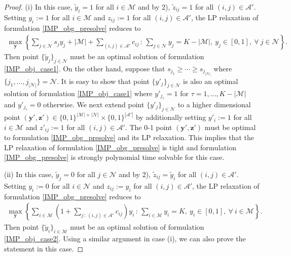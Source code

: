 \documentclass[a4paper,10pt]{article}
\theoremstyle{plain}
\newcommand{\revv}[1]{{#1}}
\begin{document}
\begin{proof}
		(i) In this case, $\tilde{y}_i=1$ for all $i\in\mathcal{M}$ and by 2), $ \tilde{z}_{ij}=1 $ for all $(i,j)\in \mathcal{A}'$. Setting $y_i := 1$  for all $i\in\mathcal{M}$ and $ {z}_{ij}:=1 $ for all $(i,j)\in \mathcal{A}'$, the LP relaxation of formulation \eqref{IMP_obg_presolve} reduces to
		\begin{equation}\label{IMP_obj_case1}
			\begin{aligned}
				\max_{\boldsymbol{y}} \left \{\sum_{j\in\mathcal{N}}s_jy_j+|\mathcal{M}|+\sum_{(i,j)\in\mathcal{A}'}c_{ij}\,:\, \sum_{j\in \mathcal{N}}y_j = K-|\mathcal{M}|, ~ y_j \in[0,1] ,~ \forall ~j\in \mathcal{N}\right\}.
			\end{aligned}
		\end{equation}
		Then point $\{ \tilde{y}_j \}_{j\in \mathcal{N}}$ must \revv{be an optimal solution of} formulation \eqref{IMP_obj_case1}.
		On the other hand, suppose that $s_{j_1} \geq \cdots \geq s_{j_{|\mathcal{N}|}} $ where $\{ j_1, \ldots, j_{|\mathcal{N}|} \} = \mathcal{N}$.
		It is easy to show that point $\{ y'_j \}_{j \in \mathcal{N}}$ is also \revv{an optimal solution of} formulation \eqref{IMP_obj_case1} where $y'_{j_\tau}=1$ for $\tau = 1, \ldots, K-|\mathcal{M}| $ and $y'_{j_\tau} = 0$ otherwise.
		We next extend point $\{ y'_j \}_{j \in \mathcal{N}}$ to a higher dimensional point $(\boldsymbol{y}',\boldsymbol{z}')\in \{0,1\}^{|\mathcal{M}|+|\mathcal{N}|}\times \{0,1\}^{|\mathcal{A}'|}$ by additionally setting $y'_i:=1$ for all $i \in \mathcal{M}$ and $z'_{ij}:=1$ for all $(i,j) \in \mathcal{A}'$.
		The 0-1 point $(\boldsymbol{y}',\boldsymbol{z}') $ must be optimal to formulation \eqref{IMP_obg_presolve} and its LP relaxation.
		This implies that the LP relaxation of formulation \eqref{IMP_obg_presolve} is tight and formulation \eqref{IMP_obg_presolve} is strongly \revv{polynomial time} solvable for this case.
		
		(ii) In this case, $\tilde{y}_j=0$ for all $j\in\mathcal{N}$ and by 2), $ \tilde{z}_{ij}=\tilde{y}_i $ for all $(i,j)\in \mathcal{A}'$. 
		Setting $y_i := 0$  for all $i\in\mathcal{N}$ and $ z_{ij}:=y_i $ for all $(i,j)\in \mathcal{A}'$, the LP relaxation of formulation \eqref{IMP_obg_presolve} reduces to
		\begin{equation}\label{IMP_obj_case2}
			\begin{aligned}
				\max_{\boldsymbol{y}} \left \{\sum_{i\in\mathcal{M}} \left (1 + \sum_{j\,:\,(i,j)\in \mathcal{A}'} c_{ij}\right )y_i\,:\,\sum_{i\in \mathcal{M}}y_i = K, ~ y_i \in[0,1] ,~ \forall ~i\in \mathcal{M}\right\}.
			\end{aligned}
		\end{equation}
		Then point $\{ \tilde{y}_i\}_{i\in \mathcal{M}}$ must be \revv{an optimal solution of} formulation \eqref{IMP_obj_case2}.
		Using a similar argument in case (i), we can also prove the statement in this case.
	\end{proof}
	
\end{document}

